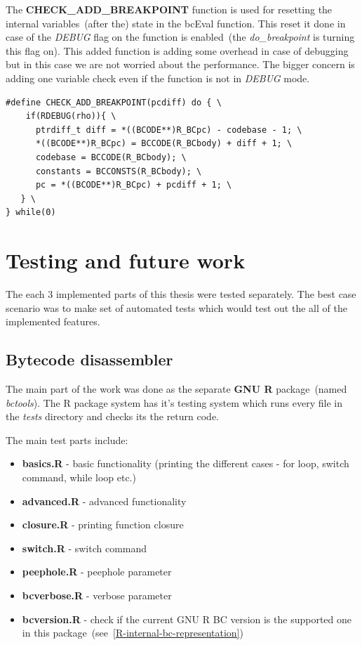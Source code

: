 \documentclass[thesis=M,english]{FITthesis}[2018/10/20]
\begin{document}
The \textbf{CHECK{\_}ADD{\_}BREAKPOINT} function is used for resetting the internal variables~(after the) state in the bcEval function. This reset it done in case of the \textit{DEBUG} flag on the function is enabled~(the \textit{do{\_}breakpoint} is turning this flag on). This added function is adding some overhead in case of debugging but in this case we are not worried about the performance. The bigger concern is adding one variable check even if the function is not in \textit{DEBUG} mode.
\begin{lstlisting}
#define CHECK_ADD_BREAKPOINT(pcdiff) do { \
    if(RDEBUG(rho)){ \
      ptrdiff_t diff = *((BCODE**)R_BCpc) - codebase - 1; \
      *((BCODE**)R_BCpc) = BCCODE(R_BCbody) + diff + 1; \
      codebase = BCCODE(R_BCbody); \
      constants = BCCONSTS(R_BCbody); \
      pc = *((BCODE**)R_BCpc) + pcdiff + 1; \
   } \
} while(0)
\end{lstlisting}

\chapter{Testing and future work}

The each 3 implemented parts of this thesis were tested separately. The best case scenario was to make set of automated tests which would test out the all of the implemented features.

\section{Bytecode disassembler}

The main part of the work was done as the separate \textbf{GNU R} package~(named \textit{bctools}). The R package system has it's testing system which runs every file in the \textit{tests} directory and checks its the return code. 

The main test parts include:
\begin{itemize}
	\item \textbf{basics.R} - basic functionality (printing the different cases - for loop, switch command, while loop etc.)
	\item \textbf{advanced.R} - advanced functionality
	\item \textbf{closure.R} - printing function closure
	\item \textbf{switch.R} - switch command
	\item \textbf{peephole.R} - peephole parameter
	\item \textbf{bcverbose.R} - verbose parameter
	\item \textbf{bcversion.R} - check if the current GNU R BC version is the supported one in this package~(see~\ref{R-internal-bc-representation})
\end{itemize}
\end{document}
